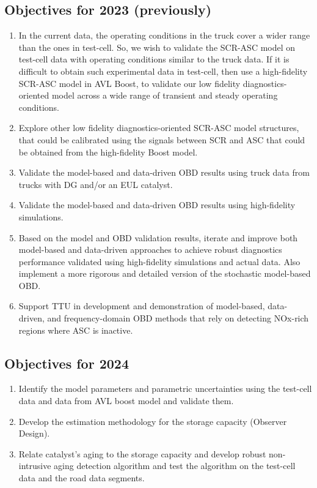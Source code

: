 \documentclass[letterpaper, 11pt]{article}
\begin{document}
\subsection{Objectives for 2023 (previously)}
\begin{enumerate}
 \item In the current data, the operating conditions in the truck cover a wider range than the ones in test-cell. So, we wish to validate the SCR-ASC model on test-cell data with operating conditions similar to the truck data. If it is difficult to obtain such experimental data in test-cell, then use a high-fidelity SCR-ASC model in AVL Boost, to validate our low fidelity diagnostics-oriented model across a wide range of transient and steady operating conditions.
 \item Explore other low fidelity diagnostics-oriented SCR-ASC model structures, that could be calibrated using the signals between SCR and ASC that could be obtained from the high-fidelity Boost model.
 \item Validate the model-based and data-driven OBD results using truck data from trucks with DG and/or an EUL catalyst.
 \item Validate the model-based and data-driven OBD results using high-fidelity simulations.
 \item Based on the model and OBD validation results, iterate and improve both model-based and data-driven approaches to achieve robust diagnostics performance validated using high-fidelity simulations and actual data. Also implement a more rigorous and detailed version of the stochastic model-based OBD.
 \item Support TTU in development and demonstration of model-based, data-driven, and frequency-domain OBD methods that rely on detecting NOx-rich regions where ASC is inactive.
\end{enumerate}


\subsection{Objectives for 2024}
\begin{enumerate}
\item Identify the model parameters and parametric uncertainties using
the test-cell data and data from AVL boost model and validate them.
\item Develop the estimation methodology for the storage capacity (Observer Design).
\item Relate catalyst's aging to the storage capacity and develop robust
non-intrusive aging detection algorithm and test the algorithm on the test-cell
data and the road data segments.
\end{enumerate}
\end{document}
